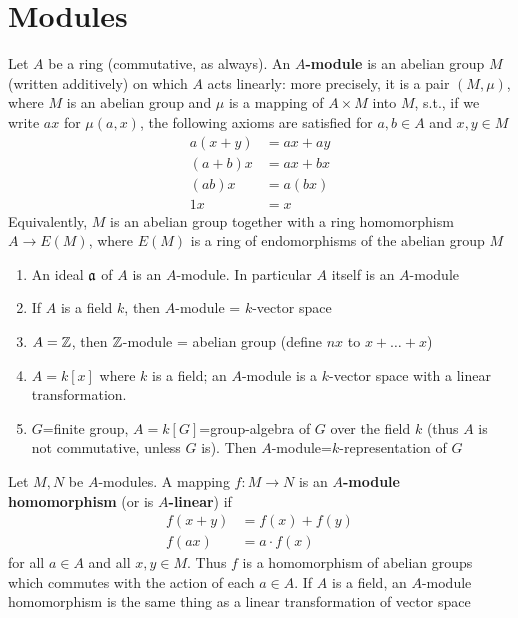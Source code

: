 \documentclass[11pt]{article}
\begin{document}
\section{Modules}
\label{sec:org3c7d671}
Let \(A\) be a ring (commutative, as always). An \textbf{\(A\)-module} is an abelian group \(M\) (written
additively) on which \(A\) acts linearly: more precisely, it is a pair \((M,\mu)\), where \(M\) is
an abelian group and \(\mu\) is a mapping of \(A\times M\) into \(M\), s.t., if we write \(ax\)
for \(\mu(a,x)\), the following axioms are satisfied for \(a,b\in A\) and \(x,y\in M\)
\begin{align*}
a(x+y)&=ax+ay\\
(a+b)x&=ax+bx\\
(ab)x&=a(bx)\\
1x&=x
\end{align*}
Equivalently, \(M\) is an abelian group together with a ring homomorphism \(A\to E(M)\),
where \(E(M)\) is a ring of endomorphisms of the abelian group \(M\)

\begin{examplle}[]
\begin{enumerate}
\item An ideal \(\mathfrak{a}\) of \(A\) is an \(A\)-module. In particular \(A\) itself is an \(A\)-module
\item If \(A\) is a field \(k\), then \(A\)-module = \(k\)-vector space
\item \(A=\mathbb{Z}\), then \(\mathbb{Z}\)-module = abelian group (define \(nx\) to \(x+\dots+x\))
\item \(A=k[x]\) where \(k\) is a field; an \(A\)-module is a \(k\)-vector space with a linear transformation.
\item \(G\)=finite group, \(A=k[G]\)=group-algebra of \(G\) over the field \(k\) (thus \(A\) is not
commutative, unless \(G\) is). Then \(A\)-module=\(k\)-representation of \(G\)
\end{enumerate}
\end{examplle}

Let \(M,N\) be \(A\)-modules. A mapping \(f:M\to N\) is an \textbf{\(A\)-module homomorphism} (or is
\textbf{\(A\)-linear}) if
\begin{align*}
f(x+y)&=f(x)+f(y)\\
f(ax)&=a\cdot f(x)
\end{align*}
for all \(a\in A\) and all \(x,y\in M\). Thus \(f\) is a homomorphism of abelian groups which
commutes with the action of each \(a\in A\). If \(A\) is a field, an \(A\)-module homomorphism is
the same thing as a linear transformation of vector space
\end{document}
